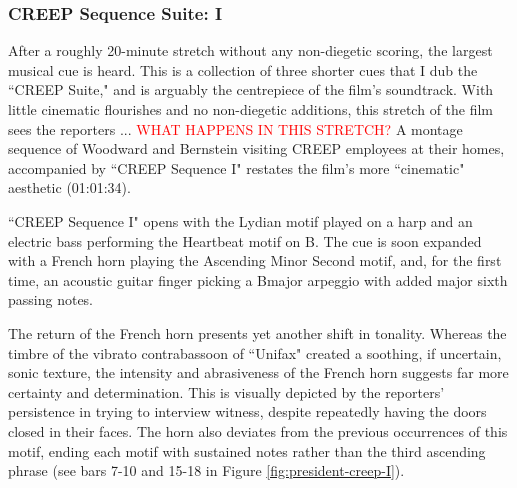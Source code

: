 \subsubsection{CREEP Sequence Suite: I}

After a roughly 20-minute stretch without any non-diegetic scoring, the largest musical cue is heard.
This is a collection of three shorter cues that I dub the ``CREEP Suite," and is arguably the centrepiece of the film's soundtrack.
With little cinematic flourishes and no non-diegetic additions, this stretch of the film sees the reporters ... \textcolor{red}{WHAT HAPPENS IN THIS STRETCH?}
A montage sequence of Woodward and Bernstein visiting CREEP employees at their homes, accompanied by ``CREEP Sequence I" restates the film's more ``cinematic" aesthetic (01:01:34).

``CREEP Sequence I" opens with the Lydian motif played on a harp and an electric bass performing the Heartbeat motif on B\flat.
The cue is soon expanded with a French horn playing the Ascending Minor Second motif, and, for the first time, an acoustic guitar finger picking a B\flat major arpeggio with added major sixth passing notes.

The return of the French horn presents yet another shift in tonality.
Whereas the timbre of the vibrato contrabassoon of ``Unifax" created a soothing, if uncertain, sonic texture, the intensity and abrasiveness of the French horn suggests far more certainty and determination.
This is visually depicted by the reporters' persistence in trying to interview witness, despite repeatedly having the doors closed in their faces.
The horn also deviates from the previous occurrences of this motif, ending each motif with sustained notes rather than the third ascending phrase (see bars 7-10 and 15-18 in Figure \ref{fig:president-creep-I}).

